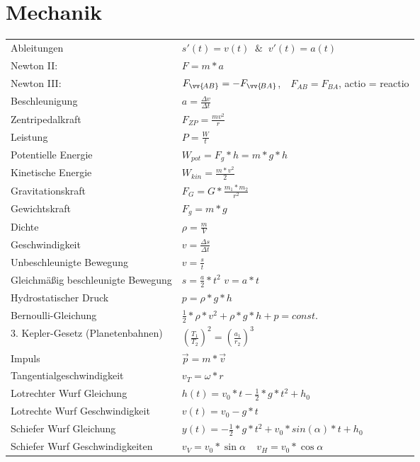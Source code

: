 \documentclass[12pt,a4paper]{paper}
\makeatletter
\newcommand{\mathleft}{\@fleqntrue\@mathmargin0pt}
\makeatother
\begin{document}
\section{Mechanik}
\mathleft
\begin{tabularx}{\textwidth}{X|X}
	Ableitungen & $s'(t) = v(t) \;\;\&\;\; v'(t) = a(t)$\\
	Newton II: & $F=m*a$\\
	Newton III: & ${F}_{\vv{\!AB}}=-{F}_{\vv{\!BA}}$,$\quad F_{AB} = F_{BA}$, actio = reactio \\
	Beschleunigung & $a=\frac{\Delta v}{\Delta t}$\\
	Zentripedalkraft & $F_{ZP}=\frac{mv^2}{r}$\\
	Leistung & $P = \frac{W}{t}$\\
	Potentielle Energie & $W_{pot} = F_g * h = m * g * h$\\
	Kinetische Energie & $W_{kin} = \frac{m*v^2}{2}$ \\
	Gravitationskraft & $F_G =G* \frac{m_1 * m_2 }{r^2}$\\
	Gewichtskraft & $F_g = m * g$\\
	Dichte & $\rho = \frac{m}{V}$\\
	Geschwindigkeit & $v = \frac{\Delta s}{\Delta t}$\\
	Unbeschleunigte Bewegung & $ v = \frac{s}{t}$\\
	Gleichmäßig beschleunigte Bewegung & $s = \frac{a}{2}*t^2$ \hspace{.5cm} $v = a * t $\\
	Hydrostatischer Druck & $p = \rho * g * h$ \\
	Bernoulli-Gleichung & $\frac{1}{2}*\rho*v^2 + \rho * g * h + p = const.$\\
	3. Kepler-Gesetz (Planetenbahnen) & $ (\frac{T_1}{T_2})^2 = (\frac{a_1}{r_2})^3$\\
	Impuls & $\vec{p} = m * \vec{v}$\\
	Tangentialgeschwindigkeit & $v_T = \omega * r$\\
	Lotrechter Wurf Gleichung & $h(t) = v_0 * t - \frac{1}{2} * g * t^2 + h_0$\\
	Lotrechte Wurf Geschwindigkeit & $v(t) = v_0 - g * t$\\
	Schiefer Wurf Gleichung & $y(t) = -\frac{1}{2}*g*t^2 + v_0*sin(\alpha)*t + h_0$\\
	Schiefer Wurf Geschwindigkeiten & $v_{V} = v_0 * \sin{\alpha} \:\:\:\:\: v_{H} = v_0 * \cos\alpha$\\
\end{tabularx}
\end{document}
